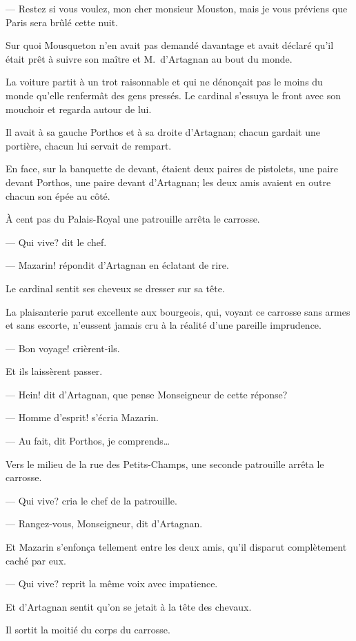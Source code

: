 — Restez si vous voulez, mon cher monsieur Mouston, mais je vous préviens que Paris sera brûlé cette nuit.

Sur quoi Mousqueton n'en avait pas demandé davantage et avait déclaré qu'il était prêt à suivre son maître et M.~d'Artagnan au bout du monde.

La voiture partit à un trot raisonnable et qui ne dénonçait pas le moins du monde qu'elle renfermât des gens pressés. Le cardinal s'essuya le front avec son mouchoir et regarda autour de lui.

Il avait à sa gauche Porthos et à sa droite d'Artagnan; chacun gardait une portière, chacun lui servait de rempart.

En face, sur la banquette de devant, étaient deux paires de pistolets, une paire devant Porthos, une paire devant d'Artagnan; les deux amis avaient en outre chacun son épée au côté.

À cent pas du Palais-Royal une patrouille arrêta le carrosse.

— Qui vive? dit le chef.

— Mazarin! répondit d'Artagnan en éclatant de rire.

Le cardinal sentit ses cheveux se dresser sur sa tête.

La plaisanterie parut excellente aux bourgeois, qui, voyant ce carrosse sans armes et sans escorte, n'eussent jamais cru à la réalité d'une pareille imprudence.

— Bon voyage! crièrent-ils.

Et ils laissèrent passer.

— Hein! dit d'Artagnan, que pense Monseigneur de cette réponse?

— Homme d'esprit! s'écria Mazarin.

— Au fait, dit Porthos, je comprends\dots

Vers le milieu de la rue des Petits-Champs, une seconde patrouille arrêta le carrosse.

— Qui vive? cria le chef de la patrouille.

— Rangez-vous, Monseigneur, dit d'Artagnan.

Et Mazarin s'enfonça tellement entre les deux amis, qu'il disparut complètement caché par eux.

— Qui vive? reprit la même voix avec impatience.

Et d'Artagnan sentit qu'on se jetait à la tête des chevaux.

Il sortit la moitié du corps du carrosse.

